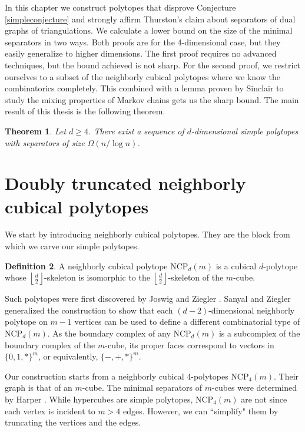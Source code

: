 \documentclass[a4paper,12pt]{book}
\theoremstyle{plain}
\newtheorem{theorem}{Theorem}[section]
\theoremstyle{definition}
\newtheorem{definition}[theorem]{Definition}
\newcommand\NC{\textrm{NCP}}
\begin{document}
In this chapter we construct polytopes that disprove Conjecture \ref{simpleconjecture} and
strongly affirm Thurston's claim about separators of dual graphs of triangulations. We
calculate a lower bound on the size of the minimal separators in two ways. Both proofs are for the
4-dimensional case, but they easily generalize to higher dimensions. The first proof requires
no advanced techniques, but the bound achieved is not sharp. For the second proof,
we restrict ourselves to a subset of the neighborly cubical polytopes where we know the 
combinatorics completely. This combined with a lemma proven by Sinclair to study
the mixing properties of Markov chains gets us the sharp bound. The main result of this
thesis is the following theorem.


\begin{theorem}
\label{maintheorem}
 Let $d\geq 4$. There exist a sequence of $d$-dimensional simple polytopes with
separators of size $\Omega(n/\log n)$.
\end{theorem}

\section{Doubly truncated neighborly cubical polytopes}
\label{ncp}

We start by introducing neighborly cubical polytopes. They are the block from which we carve our simple polytopes.

\begin{definition}
A neighborly cubical polytope $\NC_d(m)$ is a cubical $d$-polytope whose $\left\lfloor \frac{d}{2} 
\right\rfloor$-skeleton is isomorphic to the $\left\lfloor \frac{d}{2} 
\right\rfloor$-skeleton of the $m$-cube.
\end{definition}

Such polytopes were first discovered by Joswig and Ziegler \cite{Z62}. Sanyal and Ziegler \cite{Z102}
generalized the construction to show that each $(d-2)$-dimensional neighborly 
polytope on $m-1$ vertices can be used to define a 
different combinatorial type of $\NC_d(m)$. As the boundary complex of any $\NC_d(m)$
is a subcomplex of the boundary complex of the $m$-cube, its proper faces correspond to vectors
in $\{0,1,*\}^m$, or equivalently, $\{-,+,*\}^m$.


Our construction starts from a neighborly cubical 4-polytopes $\NC_4(m)$. 
Their graph is that of an $m$-cube. The minimal separators of $m$-cubes were determined by Harper 
\cite{Harp}.
While hypercubes are simple polytopes, $\NC_4(m)$ are not since each vertex is 
incident to $m>4$ edges. However, we can ``simplify" them by 
truncating the vertices and the edges.
\end{document}
